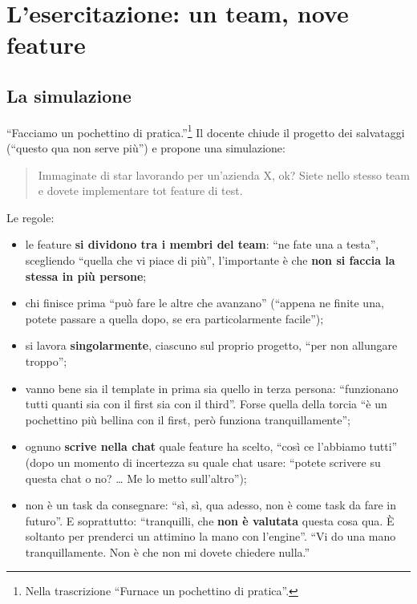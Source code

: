 \section{L'esercitazione: un team, nove feature}
\label{gd16:sec:esercitazione}

\subsection{La simulazione}

``Facciamo un pochettino di pratica.''\footnote{Nella trascrizione ``Furnace un
pochettino di pratica''.} Il docente chiude il progetto dei salvataggi (``questo
qua non serve più'') e propone una simulazione:
\begin{quote}
Immaginate di star lavorando per un'azienda X, ok? Siete nello stesso team e
dovete implementare tot feature di test.
\end{quote}
Le regole:
\begin{itemize}
  \item le feature \textbf{si dividono tra i membri del team}: ``ne fate una a
        testa'', scegliendo ``quella che vi piace di più'', l'importante è che
        \textbf{non si faccia la stessa in più persone};
  \item chi finisce prima ``può fare le altre che avanzano'' (``appena ne finite
        una, potete passare a quella dopo, se era particolarmente facile'');
  \item si lavora \textbf{singolarmente}, ciascuno sul proprio progetto, ``per
        non allungare troppo'';
  \item vanno bene sia il template in prima sia quello in terza persona:
        ``funzionano tutti quanti sia con il first sia con il third''. Forse
        quella della torcia ``è un pochettino più bellina con il first, però
        funziona tranquillamente'';
  \item ognuno \textbf{scrive nella chat} quale feature ha scelto, ``così ce
        l'abbiamo tutti'' (dopo un momento di incertezza su quale chat usare:
        ``potete scrivere su questa chat o no? \dots{} Me lo metto
        sull'altro'');
  \item non è un task da consegnare: ``sì, sì, qua adesso, non è come task da
        fare in futuro''. E soprattutto: ``tranquilli, che \textbf{non è
        valutata} questa cosa qua. È soltanto per prenderci un attimino la mano
        con l'engine''. ``Vi do una mano tranquillamente. Non è che non mi dovete
        chiedere nulla.''
\end{itemize}

